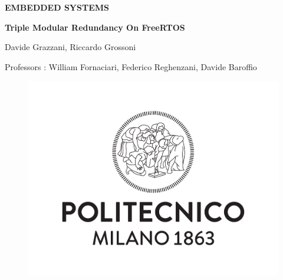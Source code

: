 \documentclass[a4paper, 12pt]{article}
\begin{document}
\noindent


\begin{titlepage}

\begin{center}
\hspace{100cm}

\vspace{1cm}

\LARGE{\textbf{EMBEDDED SYSTEMS}}

\vspace{1cm}

\huge{\textbf{ Triple Modular Redundancy On FreeRTOS}}

\vspace{1cm}

\LARGE{Davide Grazzani, Riccardo Grossoni }

\vspace{1cm}

\LARGE{Professors : William Fornaciari, Federico Reghenzani, Davide Baroffio}

\vspace{0,5cm}


\begin{figure}[h]
\begin{center}
\includegraphics[scale=1]{Logo_Politecnico_Milano.svg_.png}
\end{center}
\end{figure}

\vspace{1cm}



\end{center}

\end{titlepage}
\end{document}

